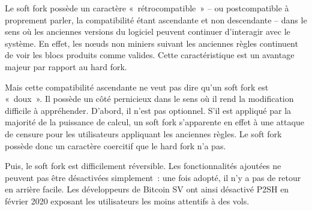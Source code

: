 
Le soft fork possède un caractère «~rétrocompatible~» -- ou postcompatible à proprement parler, la compatibilité étant ascendante et non descendante -- dans le sens où les anciennes versions du logiciel peuvent continuer d'interagir avec le système. En effet, les nœuds non miniers suivant les anciennes règles continuent de voir les blocs produits comme valides. Cette caractéristique est un avantage majeur par rapport au hard fork.


Mais cette compatibilité ascendante ne veut pas dire qu'un soft fork est «~doux~». Il possède un côté pernicieux dans le sens où il rend la modification difficile à appréhender. D'abord, il n'est pas optionnel. S'il est appliqué par la majorité de la puissance de calcul, un soft fork s'apparente en effet à une attaque de censure pour les utilisateurs appliquant les anciennes règles. Le soft fork possède donc un caractère coercitif que le hard fork n'a pas.

Puis, le soft fork est difficilement réversible. Les fonctionnalités ajoutées ne peuvent pas être désactivées simplement~: une fois adopté, il n'y a pas de retour en arrière facile. Les développeurs de Bitcoin SV ont ainsi désactivé P2SH en février 2020 exposant les utilisateurs les moins attentifs à des vols.

